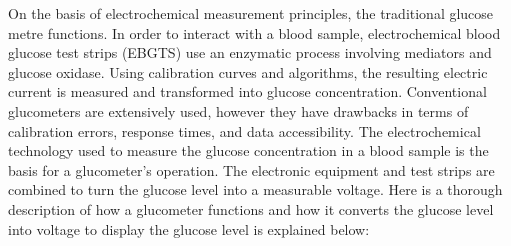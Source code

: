 \documentclass[conference,compsoc]{IEEEtran}
\begin{document}
On the basis of electrochemical measurement principles, the traditional glucose metre functions. In order to interact with a blood sample, electrochemical blood glucose test strips (EBGTS) use an enzymatic process involving mediators and glucose oxidase. Using calibration curves and algorithms, the resulting electric current is measured and transformed into glucose concentration. Conventional glucometers are extensively used, however they have drawbacks in terms of calibration errors, response times, and data accessibility.
The electrochemical technology used to measure the glucose concentration in a blood sample is the basis for a glucometer's operation. The electronic equipment and test strips are combined to turn the glucose level into a measurable voltage. Here is a thorough description of how a glucometer functions and how it converts the glucose level into voltage to display the glucose level is explained below:
\end{document}
